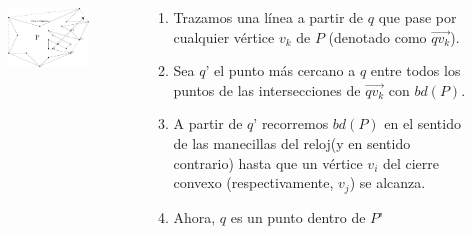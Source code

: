 \documentclass[aspectratio=169,xcolor=dvipsnames, t]{beamer}
\begin{document}
\begin{frame}{}
  \begin{columns}
    \begin{column}{0.45\textwidth}
      \begin{figure}
        \centering
        \includegraphics[width=1.1\textwidth]{imagenes/Caso02.png}
      \end{figure}
    \end{column}
    \begin{column}{0.45\textwidth}  %
      \begin{enumerate}
        \footnotesize
      \item Trazamos una línea a partir de $q$ que pase por cualquier vértice $v_{k}$ de $P$ (denotado como $\overrightarrow{qv_{k}}$). 
      \item Sea $q’$ el punto más cercano a $q$ entre todos los puntos de las intersecciones de $\overrightarrow{qv_{k}}$ con $bd(P)$. 
      \item A partir de $q’$ recorremos $bd(P)$ en el sentido de las manecillas del reloj(y en sentido contrario) hasta que un vértice $v_{i}$ del cierre convexo (respectivamente, $v_{j}$) se alcanza.
      \item  Ahora, $q$ es un punto dentro de $P’$
      \end{enumerate}
    \end{column}
  \end{columns}
\end{frame}
\end{document}
